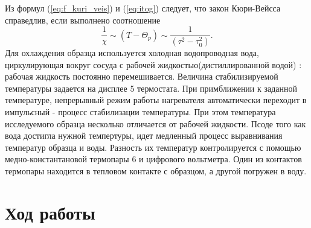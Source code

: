 \documentclass[12pt,a4paper]{article}
\begin{document}
Из формул (\ref{eq:f_kuri_veis}) и (\ref{eq:itog}) следует, что закон Кюри-Вейсса справедлив, если
выполнено соотношение
\begin{equation}
    \frac{1}{\chi} \sim (T - \Theta_p) \sim \frac{1}{(\tau^2-\tau_0^2)}. \label{eq:main}
\end{equation}
Для охлаждения образца используется холодная водопроводная вода, циркулирующая вокруг сосуда с рабочей жидкостью(дистиллированной водой) : рабочая жидкость постоянно перемешивается.
\hyphenation{} Величина стабилизируемой температуры задается на дисплее 5 термостата. При примближении к заданной температуре, непрерывный режим работы нагревателя автоматически переходит
в импульсный - процесс стабилизации температуры.
\hyphenation{}  При этом температура исследуемого образца несколько отличается от рабочей жидкости. Псоде того как вода достигла нужной темпертуры, идет медленный процесс выравнивания температур образца и воды.
Разность их температур контролируется с помощью медно-константановой термопары 6 и цифрового вольтметра. Один из контактов термопары находится в тепловом контакте с образцом, а другой погружен в воду.  

\section{Ход работы}
\end{document}
